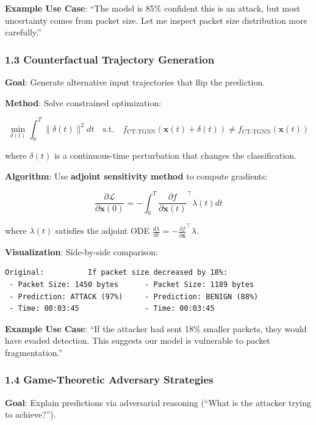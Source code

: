 \documentclass[11pt]{article}
\begin{document}
\textbf{Example Use Case}: ``The model is 85\% confident this is an attack, but most uncertainty comes from packet size. Let me inspect packet size distribution more carefully.''

\subsubsection{1.3 Counterfactual Trajectory Generation}

\textbf{Goal}: Generate alternative input trajectories that flip the prediction.

\textbf{Method}: Solve constrained optimization:

\begin{equation}
\min_{\delta(t)} \int_0^T \|\delta(t)\|^2 dt \quad \text{s.t.} \quad f_{\text{CT-TGNN}}(\mathbf{x}(t) + \delta(t)) \neq f_{\text{CT-TGNN}}(\mathbf{x}(t))
\end{equation}

where $\delta(t)$ is a continuous-time perturbation that changes the classification.

\textbf{Algorithm}: Use \textbf{adjoint sensitivity method} to compute gradients:

\begin{equation}
\frac{\partial \mathcal{L}}{\partial \mathbf{x}(0)} = -\int_0^T \frac{\partial f}{\partial \mathbf{x}(t)}^\top \lambda(t) dt
\end{equation}

where $\lambda(t)$ satisfies the adjoint ODE $\frac{d\lambda}{dt} = -\frac{\partial f}{\partial \mathbf{x}}^\top \lambda$.

\textbf{Visualization}: Side-by-side comparison:
\begin{verbatim}
Original:          If packet size decreased by 18%:
 - Packet Size: 1450 bytes      - Packet Size: 1189 bytes
 - Prediction: ATTACK (97%)     - Prediction: BENIGN (88%)
 - Time: 00:03:45               - Time: 00:03:45
\end{verbatim}

\textbf{Example Use Case}: ``If the attacker had sent 18\% smaller packets, they would have evaded detection. This suggests our model is vulnerable to packet fragmentation.''

\subsubsection{1.4 Game-Theoretic Adversary Strategies}

\textbf{Goal}: Explain predictions via adversarial reasoning (``What is the attacker trying to achieve?'').
\end{document}
